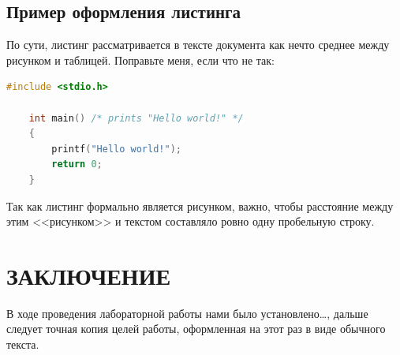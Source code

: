 \documentclass[a4paper,hidelinks,14pt]{extarticle}
\begin{document}
\newpage

\subsection{Пример оформления листинга}

По сути, листинг рассматривается в тексте документа как нечто среднее между рисунком и таблицей. Поправьте меня, если что не так:
\begin{lstlisting}[language=c,caption=Исходный код какой-то программы на C]
	#include <stdio.h>

	int main() /* prints "Hello world!" */
	{
		printf("Hello world!");
		return 0;
	}
\end{lstlisting}
Так как листинг формально является рисунком, важно, чтобы расстояние
между этим <<рисунком>> и текстом составляло ровно одну пробельную строку.


\section*{ЗАКЛЮЧЕНИЕ}

В ходе проведения лабораторной работы нами было установлено\dots,
дальше следует точная копия целей работы, оформленная на этот раз в
виде обычного текста.

\newpage



\end{document}
